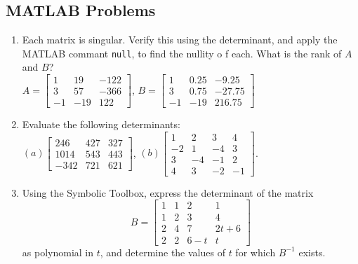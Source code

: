 \documentclass[../main.tex]{subfiles}
\begin{document}
\subsection{MATLAB Problems}
\begin{enumerate}[label=\textbf{\thechapter.\arabic{*}}, resume ]
  \item \label{pr:4_21} Each matrix is singular. Verify this using the determinant, and apply the MATLAB commant \texttt{null}, to find the nullity o f each. What is the rank of \(A\) and \(B\)?\\
  \(A = \begin{bmatrix}
    1 & 19 & -122\\
    3 & 57 & -366\\
    -1 & -19 & 122
  \end{bmatrix}\), 
  \(B = \begin{bmatrix}
    1 & 0.25 & -9.25\\
    3 & 0.75 & -27.75\\
    -1 & -19 & 216.75
  \end{bmatrix}\)
  
  \item \label{pr:4_22} Evaluate the following determinants:\\
  \((a)\begin{bmatrix}
    246 & 427 & 327\\
    1014 & 543 & 443\\
    -342 & 721 & 621
  \end{bmatrix}\), 
  \((b)\begin{bmatrix}
    1 & 2 & 3 & 4\\
    -2 & 1 & -4 & 3\\
    3 & -4 & -1 & 2\\
    4 & 3 & -2 & -1
  \end{bmatrix}\).
  
  \item \label{pr:4_23} Using the Symbolic Toolbox, express the determinant of the matrix
  \begin{equation*}
    B=\begin{bmatrix}
      1 & 1 & 2 & 1\\
      1 & 2 & 3 & 4\\
      2 & 4 & 7 & 2t+6\\
      2 & 2 & 6-t & t
    \end{bmatrix}
  \end{equation*}
  as polynomial in \(t\), and determine the values of \(t\) for which \(B^{-1}\) exists.
  

\end{enumerate}
\end{document}

